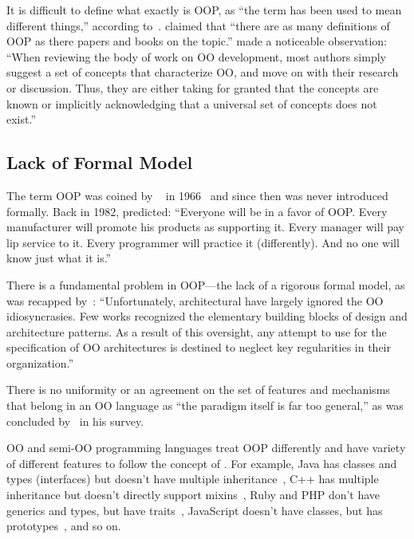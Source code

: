 It is difficult to define what exactly is OOP, as
``the term has been used to mean different things,'' according to~\citet{stefik1985object}.
\citet{madsen1988object} claimed that ``there are as many
definitions of OOP as there papers and books on the topic.''
\citet{armstrong2006quarks} made a noticeable observation: ``When
reviewing the body of work on OO development, most authors simply suggest a set
of concepts that characterize OO, and move on with their research or discussion.
Thus, they are either taking for granted that the concepts are known or implicitly
acknowledging that a universal set of concepts does not exist.''

\subsection{Lack of Formal Model}

The term OOP was coined by ~\citet{kay97keynote} in 1966~\cite{kaymaster68}
and since then was never introduced formally.
Back in 1982, \citet{rentsch1982object} predicted: ``Everyone will be in a favor
of OOP. Every manufacturer will promote his products as supporting it. Every
manager will pay lip service to it. Every programmer will practice
it (differently). And no one will know just what it is.''

There is a fundamental problem in OOP---the lack of a rigorous formal model,
as was recapped by~\citet{eden2001principles}: ``Unfortunately, architectural
 have largely ignored the OO idiosyncrasies. Few works recognized the
elementary building blocks of design and architecture patterns.
As a result of this oversight, any attempt to use  for the specification of OO
architectures is destined to neglect key regularities in their organization.''

There is no uniformity or an agreement on the set of features and mechanisms
that belong in an OO language as ``the paradigm itself is far too general,'' as was
concluded by~\citet{nierstrasz1989survey} in his survey.

OO and semi-OO programming languages treat OOP differently and have variety of
different features to follow the concept of . For
example, Java has classes and types (interfaces) but doesn't
have multiple inheritance~\citep{alpern2001efficient},
C++ has multiple inheritance but doesn't directly support mixins~\citep{burton2014using},
Ruby and PHP don't have generics and types, but have traits~\citep{bi2018typed},
JavaScript doesn't have classes, but has prototypes~\citep{richards2010analysis}, and so on.

